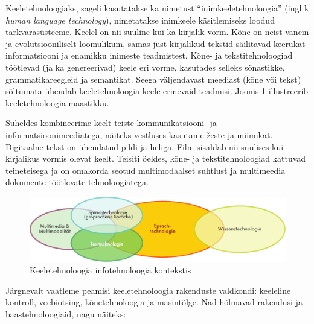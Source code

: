 \clearpage



\begin{multicols}{2}


Keeletehnoloogiaks, sageli kasutatakse ka nimetust ``inimkeeletehnoloogia'' (ingl k \textit{human language technology}), nimetatakse inimkeele käsitlemiseks loodud tarkvarasüsteeme. 
Keelel on nii suuline kui ka kirjalik vorm. 
Kõne on neist vanem ja evolutsiooniliselt loomulikum, samas just kirjalikud tekstid säilitavad keerukat informatsiooni ja enamikku inimeste teadmistest. 
Kõne- ja tekstitehnoloogiad töötlevad (ja ka genereerivad) keele eri vorme, kasutades selleks sõnastikke, grammatikareegleid ja semantikat. 
Seega väljendavast meediast (kõne või tekst) sõltumata ühendab keeletehnoloogia keele erinevaid teadmisi. 
Joonis \ref{fig:ltincontext_ee} illustreerib keeletehnoloogia maastikku. 

Suheldes kombineerime keelt teiste kommunikat\-siooni- ja informatsioonimeediatega, näiteks vestluses kasutame žeste ja miimikat. 
Digitaalne tekst on ühendatud pildi ja heliga. 
Film sisaldab nii suulises kui kirjalikus vormis olevat keelt. 
Teisiti öeldes, kõne- ja tekstitehnoloogiad kattuvad teineteisega ja on omakorda seotud multimodaalset suhtlust ja multimeedia dokumente töötlevate tehnoloogiatega. 

\begin{figure}[htb]
  \center
  \includegraphics[width=\textwidth]{../_media/german/language_technologies}
  \caption{Keeletehnoloogia infotehnoloogia kontekstis}
  \label{fig:ltincontext_ee}
\end{figure}

Järgnevalt vaatleme peamisi keeletehnoloogia rakenduste valdkondi: keeleline kontroll, veebiotsing, kõnetehnoloogia ja masintõlge. 
Nad hõlmavad rakendusi ja baastehnoloogiaid, nagu näiteks:


\end{multicols}
